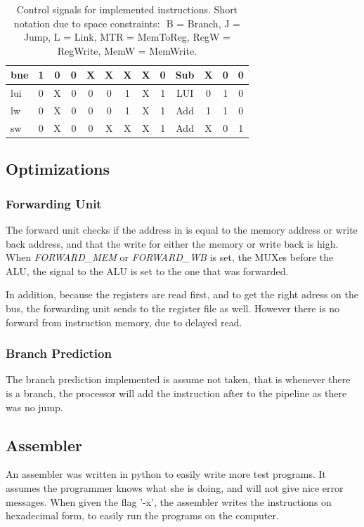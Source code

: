 \begin{table}[ht]
\begin{tabular}{|l|c|c|c|c|c|c|c|c|c|c|c|c|}
        bne        & 1 & 0 & 0 & X & X & X & X & 0 & Sub & X & 0 & 0 \\
        \hline
        lui        & 0 & X & 0 & 0 & 0 & 1 & X & 1 & LUI & 0 & 1 & 0 \\
        lw         & 0 & X & 0 & 0 & 0 & 1 & X & 1 & Add & 1 & 1 & 0 \\
        sw         & 0 & X & 0 & 0 & X & X & X & 1 & Add & X & 0 & 1 \\
        \hline
    \end{tabular}
    \caption{Control signals for implemented instructions. Short notation due to space constraints: $ $ B = Branch, J = Jump, L = Link, MTR = MemToReg, RegW = RegWrite, MemW = MemWrite.}
    \label{table:ctrlsignals}
\end{table}


\subsection{Optimizations}
\subsubsection*{Forwarding Unit}
The forward unit checks if the address in is equal to the memory
address or write back address, and that the write for either the memory or write
back is high. When \textit{FORWARD\_MEM} or \textit{FORWARD\_WB} is set, the
MUXes before the ALU, the signal to the ALU is set to the one that was
forwarded. 

In addition, because the registers are read first, and to get the right adress
on the bus, the forwarding unit sends to the register file as well. However
there is no forward from instruction memory, due to delayed read.

\subsubsection*{Branch Prediction}
The branch prediction implemented is assume not taken, that is whenever there is a
branch, the processor will add the instruction after to the pipeline as there
was no jump. 

\subsection{Assembler}
An assembler was written in python to easily write more test programs. It
assumes the programmer knows what she is doing, and will not give nice error
messages. When given the flag '-x', the assembler writes the instructions on
hexadecimal form, to easily run the programs on the computer.

